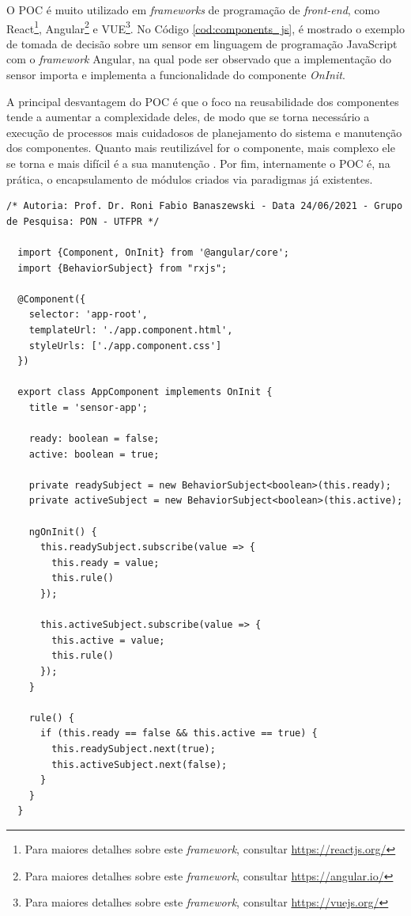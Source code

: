 O POC é muito utilizado em \textit{frameworks} de programação de
\textit{front-end}, como React\footnote{Para maiores detalhes sobre este
\textit{framework}, consultar \url{https://reactjs.org/}}, Angular\footnote{Para
maiores detalhes sobre este \textit{framework}, consultar
\url{https://angular.io/}} e VUE\footnote{Para maiores detalhes sobre este
\textit{framework}, consultar \url{https://vuejs.org/}}. No Código
\ref{cod:components_js}, é mostrado o exemplo de tomada de decisão sobre um
sensor em linguagem de programação JavaScript com o \textit{framework} Angular,
na qual pode ser observado que a implementação do sensor importa e implementa a
funcionalidade do componente \textit{OnInit}.

A principal desvantagem do POC é que o foco na reusabilidade dos componentes
tende a aumentar a complexidade deles, de modo que se torna necessário a
execução de processos mais cuidadosos de planejamento do sistema e manutenção
dos componentes. Quanto mais reutilizável for o componente, mais complexo ele se
torna e mais difícil é a sua manutenção \cite{crnkovic_2002}. Por fim,
internamente o POC é, na prática, o encapsulamento de módulos criados via
paradigmas já existentes.

\begin{lstlisting}[caption = {Exemplo de aplicação de sensor em React no POC},
  source = {Autoria própria}, float=htb,
  label  = {cod:components_js}]
  /* Autoria: Prof. Dr. Roni Fabio Banaszewski - Data 24/06/2021 - Grupo de Pesquisa: PON - UTFPR */ 
  
  import {Component, OnInit} from '@angular/core';
  import {BehaviorSubject} from "rxjs";
  
  @Component({
    selector: 'app-root',
    templateUrl: './app.component.html',
    styleUrls: ['./app.component.css']
  })
  
  export class AppComponent implements OnInit {
    title = 'sensor-app';
  
    ready: boolean = false;
    active: boolean = true;
  
    private readySubject = new BehaviorSubject<boolean>(this.ready);
    private activeSubject = new BehaviorSubject<boolean>(this.active);
  
    ngOnInit() {
      this.readySubject.subscribe(value => {
        this.ready = value;
        this.rule()
      });
  
      this.activeSubject.subscribe(value => {
        this.active = value;
        this.rule()
      });
    }
  
    rule() {
      if (this.ready == false && this.active == true) {
        this.readySubject.next(true);
        this.activeSubject.next(false);
      }
    }
  }
\end{lstlisting}

